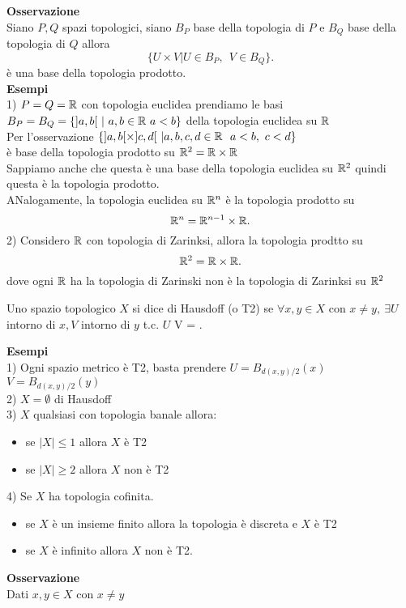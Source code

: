 \documentclass[12px]{article}
\begin{document}
 \textbf{Osservazione}\\
 Siano $P,Q$ spazi topologici, siano  $B_P$ base della topologia di  $P$ e  $B_Q$ base della topologia di $Q$ allora
  \[
	  \{U\times V| U\in B_P, \ \ V\in B_Q\}
 .\] 
 è una base della topologia prodotto.\\
 \textbf{Esempi}\\
 1) $P = Q = \mathbb{R}$ con topologia euclidea prendiamo le basi  $B_P = B_Q = \{]a,b[\ |\ a,b\in \R \ a< b\}$ della topologia euclidea su  $\mathbb{R}$\\
 Per l'osservazione  $\{]a,b[\times]c,d[\ | a,b,c,d\in\mathbb{R} \ \ a < b,\ c < d\}$\\
 è base della topologia prodotto su  $\mathbb{R}^2 = \mathbb{R}\times \mathbb{R}$\\
 Sappiamo anche che questa è una base della topologia euclidea su  $\mathbb{R}^2$ quindi questa è la topologia prodotto.\\
 ANalogamente, la topologia euclidea su  $\mathbb{R}^n$ è la topologia prodotto su 
  \[
	  \mathbb{R}^n = \mathbb{R}^{n-1}\times\mathbb{R}
 .\] 
 2) Considero $\mathbb{R} $ con topologia di Zarinksi, allora la topologia prodtto su
 \[
	 \mathbb{R}^2 = \mathbb{R}\times \mathbb{R}
 .\] 
 dove ogni $\mathbb{R}$ ha la topologia di Zarinski non è la topologia di Zarinksi su $\mathbb{R}^2$\\
 \begin{defi}
 	Uno spazio topologico $X$ si dice di Hausdoff (o T2) se $\forall x,y\in X$ con  $x\neq y, \ \exists U$  intorno di  $x, V $  intorno di $y$  t.c.  $U$ \cap V = \emptyset.
 \end{defi}
 \textbf{Esempi}\\
 1) Ogni spazio metrico è T2, basta prendere $U = B_{d(x,y)/2}(x)$ $V = B_{d(x,y)/2}(y)$\\
 2) $X = \emptyset$ di Hausdoff\\
3) $X$ qualsiasi con topologia banale  allora:
\begin{itemize}
	\item se $|X|\leq 1$ allora  $X$ è T2
	\item se  $|X| \geq 2$ allora  $X$ non è T2
\end{itemize}
4) Se $X$ ha topologia cofinita.
\begin{itemize}
	\item se $X$ è un insieme finito allora la topologia è discreta e $X$ è T2
	\item se $X$ è infinito allora $X $ non è T2.
\end{itemize}
\textbf{Osservazione}\\
Dati $x,y\in X$ con  $x\neq y$\\
\end{document}
